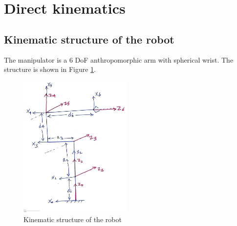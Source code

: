 \section{Direct kinematics}\label{sec:direct}
\subsection{Kinematic structure of the robot}\label{subsec:kine_struct}
The manipulator is a 6 DoF anthropomorphic arm with spherical wrist. The structure is
shown in Figure \ref{fig:kine_struct}.
\begin{figure}[H]
    \centering
    \includegraphics[width=0.5\textwidth]{images/kine_struct}
    \caption{Kinematic structure of the robot}
    \label{fig:kine_struct}
\end{figure}

